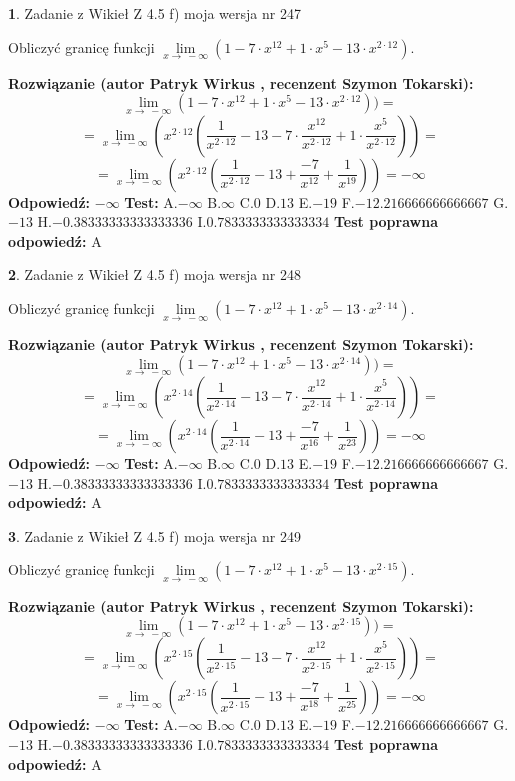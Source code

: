 \documentclass[12pt, a4paper]{article}
\theoremstyle{definition} %
\newtheorem{zad}{}
\newcommand{\zadStart}[1]{\begin{zad}#1\newline}
\newcommand{\zadStop}{\end{zad}}
\newcommand{\rozwStart}[2]{\noindent \textbf{Rozwiązanie (autor #1 , recenzent #2): }\newline}
\newcommand{\rozwStop}{\newline}
\newcommand{\odpStart}{\noindent \textbf{Odpowiedź:}\newline}
\newcommand{\odpStop}{\newline}
\newcommand{\testStart}{\noindent \textbf{Test:}\newline}
\newcommand{\testStop}{\newline}
\newcommand{\kluczStart}{\noindent \textbf{Test poprawna odpowiedź:}\newline}
\newcommand{\kluczStop}{\newline}
\begin{document}
\zadStart{Zadanie z Wikieł Z 4.5 f) moja wersja nr 247}


Obliczyć granicę funkcji  $\lim\limits_{x\to\ -\infty}(1 - 7 \cdot x^{12}+1 \cdot x^{5}- 13 \cdot x^{2\cdot12})$.
\zadStop
\rozwStart{Patryk Wirkus}{Szymon Tokarski}
$$\lim\limits_{x\to\ -\infty}(1 - 7 \cdot x^{12}+1 \cdot x^{5}- 13 \cdot x^{2\cdot12}))=$$
$$=\lim\limits_{x\to\ -\infty}(x^{2\cdot12}(\frac{1}{x^{2\cdot12}}-13 -7 \cdot \frac{x^{12}}{x^{2\cdot12}}+1 \cdot \frac{x^{5}}{x^{2\cdot12}}))=$$
$$=\lim\limits_{x\to\ -\infty}(x^{2\cdot12}(\frac{1}{x^{2\cdot12}}-13 + \frac{-7}{x^{12}}+ \frac{1}{x^{19}}))=-\infty$$
\rozwStop
\odpStart
$-\infty$
\odpStop
\testStart
A.$-\infty$ B.$\infty$ C.$0$ D.$13$ E.$-19$
F.$-12.216666666666667$ G.$-13$
H.$-0.38333333333333336$
I.$0.7833333333333334$
\testStop
\kluczStart
A
\kluczStop



\zadStart{Zadanie z Wikieł Z 4.5 f) moja wersja nr 248}


Obliczyć granicę funkcji  $\lim\limits_{x\to\ -\infty}(1 - 7 \cdot x^{12}+1 \cdot x^{5}- 13 \cdot x^{2\cdot14})$.
\zadStop
\rozwStart{Patryk Wirkus}{Szymon Tokarski}
$$\lim\limits_{x\to\ -\infty}(1 - 7 \cdot x^{12}+1 \cdot x^{5}- 13 \cdot x^{2\cdot14}))=$$
$$=\lim\limits_{x\to\ -\infty}(x^{2\cdot14}(\frac{1}{x^{2\cdot14}}-13 -7 \cdot \frac{x^{12}}{x^{2\cdot14}}+1 \cdot \frac{x^{5}}{x^{2\cdot14}}))=$$
$$=\lim\limits_{x\to\ -\infty}(x^{2\cdot14}(\frac{1}{x^{2\cdot14}}-13 + \frac{-7}{x^{16}}+ \frac{1}{x^{23}}))=-\infty$$
\rozwStop
\odpStart
$-\infty$
\odpStop
\testStart
A.$-\infty$ B.$\infty$ C.$0$ D.$13$ E.$-19$
F.$-12.216666666666667$ G.$-13$
H.$-0.38333333333333336$
I.$0.7833333333333334$
\testStop
\kluczStart
A
\kluczStop



\zadStart{Zadanie z Wikieł Z 4.5 f) moja wersja nr 249}


Obliczyć granicę funkcji  $\lim\limits_{x\to\ -\infty}(1 - 7 \cdot x^{12}+1 \cdot x^{5}- 13 \cdot x^{2\cdot15})$.
\zadStop
\rozwStart{Patryk Wirkus}{Szymon Tokarski}
$$\lim\limits_{x\to\ -\infty}(1 - 7 \cdot x^{12}+1 \cdot x^{5}- 13 \cdot x^{2\cdot15}))=$$
$$=\lim\limits_{x\to\ -\infty}(x^{2\cdot15}(\frac{1}{x^{2\cdot15}}-13 -7 \cdot \frac{x^{12}}{x^{2\cdot15}}+1 \cdot \frac{x^{5}}{x^{2\cdot15}}))=$$
$$=\lim\limits_{x\to\ -\infty}(x^{2\cdot15}(\frac{1}{x^{2\cdot15}}-13 + \frac{-7}{x^{18}}+ \frac{1}{x^{25}}))=-\infty$$
\rozwStop
\odpStart
$-\infty$
\odpStop
\testStart
A.$-\infty$ B.$\infty$ C.$0$ D.$13$ E.$-19$
F.$-12.216666666666667$ G.$-13$
H.$-0.38333333333333336$
I.$0.7833333333333334$
\testStop
\kluczStart
A
\kluczStop
\end{document}
